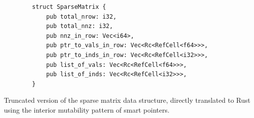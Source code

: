 \begin{code}
    \begin{verbatim}
        struct SparseMatrix {
            pub total_nrow: i32,
            pub total_nnz: i32,
            pub nnz_in_row: Vec<i64>,
            pub ptr_to_vals_in_row: Vec<Rc<RefCell<f64>>>,
            pub ptr_to_inds_in_row: Vec<Rc<RefCell<i32>>>,
            pub list_of_vals: Vec<Rc<RefCell<f64>>>,
            pub list_of_inds: Vec<Rc<RefCell<i32>>>,
        }
    \end{verbatim}
    \caption{Truncated version of the sparse matrix data structure, directly translated to Rust using the interior mutability pattern of smart pointers.}
    \label{listing:rust-sparse-matrix-structure}
\end{code}



